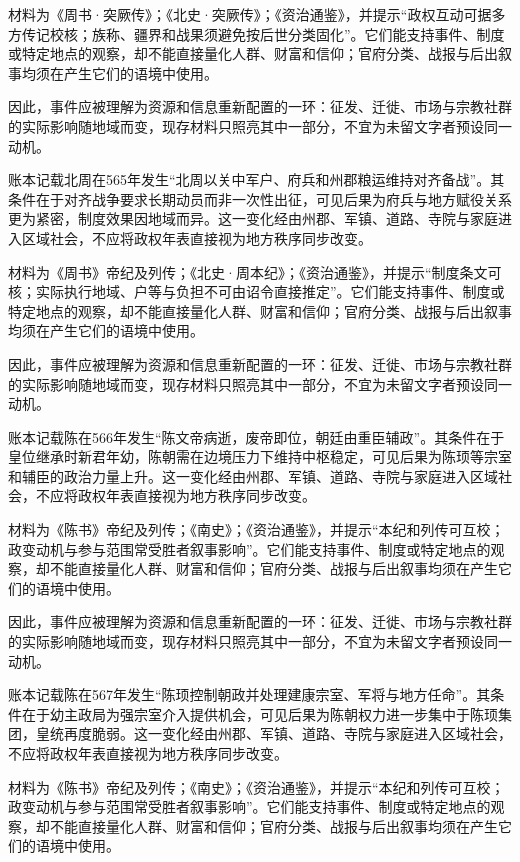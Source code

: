材料为《周书·突厥传》；《北史·突厥传》；《资治通鉴》，并提示“政权互动可据多方传记校核；族称、疆界和战果须避免按后世分类固化”。它们能支持事件、制度或特定地点的观察，却不能直接量化人群、财富和信仰；官府分类、战报与后出叙事均须在产生它们的语境中使用。

因此，事件应被理解为资源和信息重新配置的一环：征发、迁徙、市场与宗教社群的实际影响随地域而变，现存材料只照亮其中一部分，不宜为未留文字者预设同一动机。

账本记载北周在565年发生“北周以关中军户、府兵和州郡粮运维持对齐备战”。其条件在于对齐战争要求长期动员而非一次性出征，可见后果为府兵与地方赋役关系更为紧密，制度效果因地域而异。这一变化经由州郡、军镇、道路、寺院与家庭进入区域社会，不应将政权年表直接视为地方秩序同步改变。

材料为《周书》帝纪及列传；《北史·周本纪》；《资治通鉴》，并提示“制度条文可核；实际执行地域、户等与负担不可由诏令直接推定”。它们能支持事件、制度或特定地点的观察，却不能直接量化人群、财富和信仰；官府分类、战报与后出叙事均须在产生它们的语境中使用。

因此，事件应被理解为资源和信息重新配置的一环：征发、迁徙、市场与宗教社群的实际影响随地域而变，现存材料只照亮其中一部分，不宜为未留文字者预设同一动机。

账本记载陈在566年发生“陈文帝病逝，废帝即位，朝廷由重臣辅政”。其条件在于皇位继承时新君年幼，陈朝需在边境压力下维持中枢稳定，可见后果为陈顼等宗室和辅臣的政治力量上升。这一变化经由州郡、军镇、道路、寺院与家庭进入区域社会，不应将政权年表直接视为地方秩序同步改变。

材料为《陈书》帝纪及列传；《南史》；《资治通鉴》，并提示“本纪和列传可互校；政变动机与参与范围常受胜者叙事影响”。它们能支持事件、制度或特定地点的观察，却不能直接量化人群、财富和信仰；官府分类、战报与后出叙事均须在产生它们的语境中使用。

因此，事件应被理解为资源和信息重新配置的一环：征发、迁徙、市场与宗教社群的实际影响随地域而变，现存材料只照亮其中一部分，不宜为未留文字者预设同一动机。

账本记载陈在567年发生“陈顼控制朝政并处理建康宗室、军将与地方任命”。其条件在于幼主政局为强宗室介入提供机会，可见后果为陈朝权力进一步集中于陈顼集团，皇统再度脆弱。这一变化经由州郡、军镇、道路、寺院与家庭进入区域社会，不应将政权年表直接视为地方秩序同步改变。

材料为《陈书》帝纪及列传；《南史》；《资治通鉴》，并提示“本纪和列传可互校；政变动机与参与范围常受胜者叙事影响”。它们能支持事件、制度或特定地点的观察，却不能直接量化人群、财富和信仰；官府分类、战报与后出叙事均须在产生它们的语境中使用。

